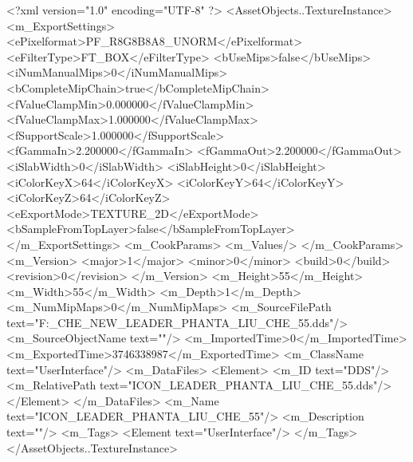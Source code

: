 <?xml version="1.0" encoding="UTF-8" ?>
<AssetObjects..TextureInstance>
	<m_ExportSettings>
		<ePixelformat>PF_R8G8B8A8_UNORM</ePixelformat>
		<eFilterType>FT_BOX</eFilterType>
		<bUseMips>false</bUseMips>
		<iNumManualMips>0</iNumManualMips>
		<bCompleteMipChain>true</bCompleteMipChain>
		<fValueClampMin>0.000000</fValueClampMin>
		<fValueClampMax>1.000000</fValueClampMax>
		<fSupportScale>1.000000</fSupportScale>
		<fGammaIn>2.200000</fGammaIn>
		<fGammaOut>2.200000</fGammaOut>
		<iSlabWidth>0</iSlabWidth>
		<iSlabHeight>0</iSlabHeight>
		<iColorKeyX>64</iColorKeyX>
		<iColorKeyY>64</iColorKeyY>
		<iColorKeyZ>64</iColorKeyZ>
		<eExportMode>TEXTURE_2D</eExportMode>
		<bSampleFromTopLayer>false</bSampleFromTopLayer>
	</m_ExportSettings>
	<m_CookParams>
		<m_Values/>
	</m_CookParams>
	<m_Version>
		<major>1</major>
		<minor>0</minor>
		<build>0</build>
		<revision>0</revision>
	</m_Version>
	<m_Height>55</m_Height>
	<m_Width>55</m_Width>
	<m_Depth>1</m_Depth>
	<m_NumMipMaps>0</m_NumMipMaps>
	<m_SourceFilePath text="F:\MOD\TEMPLATE\LIU_CHE_NEW\ICON_LEADER_PHANTA_LIU_CHE_55.dds"/>
	<m_SourceObjectName text=""/>
	<m_ImportedTime>0</m_ImportedTime>
	<m_ExportedTime>3746338987</m_ExportedTime>
	<m_ClassName text="UserInterface"/>
	<m_DataFiles>
		<Element>
			<m_ID text="DDS"/>
			<m_RelativePath text="ICON_LEADER_PHANTA_LIU_CHE_55.dds"/>
		</Element>
	</m_DataFiles>
	<m_Name text="ICON_LEADER_PHANTA_LIU_CHE_55"/>
	<m_Description text=""/>
	<m_Tags>
		<Element text="UserInterface"/>
	</m_Tags>
</AssetObjects..TextureInstance>

